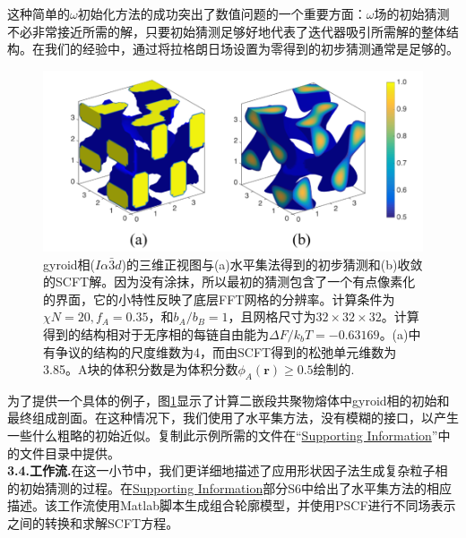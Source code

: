 \documentclass[12pt,a4paper]{article}
\begin{document}
这种简单的$\omega$初始化方法的成功突出了数值问题的一个重要方面：$\omega$场的初始猜测不必非常接近所需的解，只要初始猜测足够好地代表了迭代器吸引所需解的整体结构。在我们的经验中，通过将拉格朗日场设置为零得到的初步猜测通常是足够的。
\begin{figure}[H]
	\centering
	\includegraphics[scale=0.5]{./figures/22.png}
	\caption{gyroid相($I\alpha \bar{3}d$)的三维正视图与(a)水平集法得到的初步猜测和(b)收敛的SCFT解。因为没有涂抹，所以最初的猜测包含了一个有点像素化的界面，它的小特性反映了底层FFT网格的分辨率。计算条件为$\chi N=20,f_A =0.35$，和$b_A/b_B=1$，且网格尺寸为$32\times 32\times 32$。计算得到的结构相对于无序相的每链自由能为$\Delta F /k_b T =-0.63169$。(a)中有争议的结构的尺度维数为4，而由SCFT得到的松弛单元维数为3.85。A块的体积分数是为体积分数$\phi _A(\mathbf{r})\geqslant 0.5$绘制的.
	}
	\label{figure22}
\end{figure}
为了提供一个具体的例子，图\ref{figure22}显示了计算二嵌段共聚物熔体中gyroid相的初始和最终组成剖面。在这种情况下，我们使用了水平集方法，没有模糊的接口，以产生一些什么粗略的初始近似。复制此示例所需的文件在“\href{http://pubs.acs.org/doi/suppl/10.1021/acs.macromol.6b00107/suppl_file/ma6b00107_si_001.pdf}{Supporting Information}”中的文件目录中提供。\\
\textbf{3.4.工作流.}在这一小节中，我们更详细地描述了应用形状因子法生成复杂粒子相的初始猜测的过程。在\href{http://pubs.acs.org/doi/suppl/10.1021/acs.macromol.6b00107/suppl_file/ma6b00107_si_001.pdf}{Supporting Information}部分S6中给出了水平集方法的相应描述。该工作流使用Matlab脚本生成组合轮廓模型，并使用PSCF进行不同场表示之间的转换和求解SCFT方程。
\end{document}

